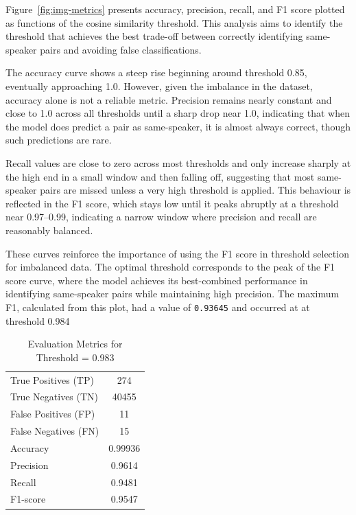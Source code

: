 \documentclass[conference]{IEEEtran}
\begin{document}
	Figure~\ref{fig:img-metrics} presents accuracy, precision, recall, and F1 score plotted as functions of the cosine similarity threshold. This analysis aims to identify the threshold that achieves the best trade-off between correctly identifying same-speaker pairs and avoiding false classifications.
	
	The accuracy curve shows a steep rise beginning around threshold 0.85, eventually approaching 1.0. However, given the imbalance in the dataset, accuracy alone is not a reliable metric. Precision remains nearly constant and close to 1.0 across all thresholds until a sharp drop near 1.0, indicating that when the model does predict a pair as same-speaker, it is almost always correct, though such predictions are rare.
	
	Recall values are close to zero across most thresholds and only increase sharply at the high end in a small window and then falling off, suggesting that most same-speaker pairs are missed unless a very high threshold is applied. This behaviour is reflected in the F1 score, which stays low until it peaks abruptly at a threshold near 0.97–0.99, indicating a narrow window where precision and recall are reasonably balanced.
	
	These curves reinforce the importance of using the F1 score in threshold selection for imbalanced data. The optimal threshold corresponds to the peak of the F1 score curve, where the model achieves its best-combined performance in identifying same-speaker pairs while maintaining high precision. The maximum F1, calculated from this plot, had a value of \texttt{0.93645} and occurred at at threshold 0.984
	
	\begin{table}[ht]
		\centering
		\begin{tabular}{|l|c|}
			\hline
			True Positives (TP) & 274 \\
			True Negatives (TN) & 40455 \\
			False Positives (FP) & 11 \\
			False Negatives (FN) & 15 \\
			Accuracy            & 0.99936 \\
			Precision           & 0.9614 \\
			Recall              & 0.9481 \\
			F1-score            & 0.9547 \\
			\hline
		\end{tabular}
		\caption{Evaluation Metrics for Threshold = 0.983}
		\label{tbl:metrics-0.983}
	\end{table}
	
\end{document}
